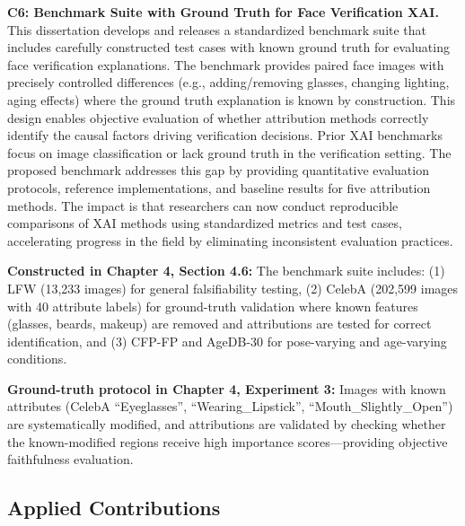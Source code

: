 \textbf{C6: Benchmark Suite with Ground Truth for Face Verification XAI.} This dissertation develops and releases a standardized benchmark suite that includes carefully constructed test cases with known ground truth for evaluating face verification explanations. The benchmark provides paired face images with precisely controlled differences (e.g., adding/removing glasses, changing lighting, aging effects) where the ground truth explanation is known by construction. This design enables objective evaluation of whether attribution methods correctly identify the causal factors driving verification decisions. Prior XAI benchmarks focus on image classification \cite{hooker2019benchmark} or lack ground truth in the verification setting. The proposed benchmark addresses this gap by providing quantitative evaluation protocols, reference implementations, and baseline results for five attribution methods. The impact is that researchers can now conduct reproducible comparisons of XAI methods using standardized metrics and test cases, accelerating progress in the field by eliminating inconsistent evaluation practices.

\vspace{0.3cm}
\noindent\textbf{Constructed in Chapter 4, Section 4.6:} The benchmark suite includes: (1) LFW (13,233 images) for general falsifiability testing, (2) CelebA (202,599 images with 40 attribute labels) for ground-truth validation where known features (glasses, beards, makeup) are removed and attributions are tested for correct identification, and (3) CFP-FP and AgeDB-30 for pose-varying and age-varying conditions.

\vspace{0.3cm}
\noindent\textbf{Ground-truth protocol in Chapter 4, Experiment 3:} Images with known attributes (CelebA ``Eyeglasses'', ``Wearing\_Lipstick'', ``Mouth\_Slightly\_Open'') are systematically modified, and attributions are validated by checking whether the known-modified regions receive high importance scores---providing objective faithfulness evaluation.

\subsection{Applied Contributions}

